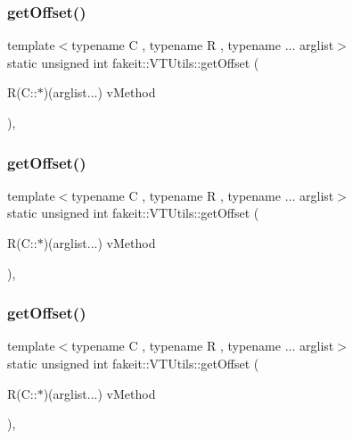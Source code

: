 \mbox{\label{classfakeit_1_1VTUtils_a0e019646d770355889228b1d88675530}} 
\subsubsection{\texorpdfstring{getOffset()}{getOffset()}\hspace{0.1cm}{\footnotesize\ttfamily [2/9]}}
{\footnotesize\ttfamily template$<$typename C , typename R , typename ... arglist$>$ \\
static unsigned int fakeit\+::\+V\+T\+Utils\+::get\+Offset (\begin{DoxyParamCaption}\item[{R(C\+::$\ast$)(arglist...)}]{v\+Method }\end{DoxyParamCaption})\hspace{0.3cm}{\ttfamily [inline]}, {\ttfamily [static]}}

\mbox{\label{classfakeit_1_1VTUtils_a0e019646d770355889228b1d88675530}} 
\subsubsection{\texorpdfstring{getOffset()}{getOffset()}\hspace{0.1cm}{\footnotesize\ttfamily [3/9]}}
{\footnotesize\ttfamily template$<$typename C , typename R , typename ... arglist$>$ \\
static unsigned int fakeit\+::\+V\+T\+Utils\+::get\+Offset (\begin{DoxyParamCaption}\item[{R(C\+::$\ast$)(arglist...)}]{v\+Method }\end{DoxyParamCaption})\hspace{0.3cm}{\ttfamily [inline]}, {\ttfamily [static]}}

\mbox{\label{classfakeit_1_1VTUtils_a0e019646d770355889228b1d88675530}} 
\subsubsection{\texorpdfstring{getOffset()}{getOffset()}\hspace{0.1cm}{\footnotesize\ttfamily [4/9]}}
{\footnotesize\ttfamily template$<$typename C , typename R , typename ... arglist$>$ \\
static unsigned int fakeit\+::\+V\+T\+Utils\+::get\+Offset (\begin{DoxyParamCaption}\item[{R(C\+::$\ast$)(arglist...)}]{v\+Method }\end{DoxyParamCaption})\hspace{0.3cm}{\ttfamily [inline]}, {\ttfamily [static]}}

